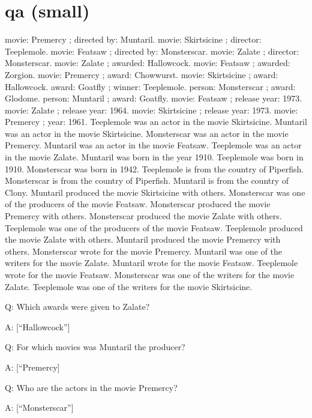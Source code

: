 \documentclass[
]{article}
\begin{document}
\section{qa (small)}\label{qa-small}

movie: Premercy ; directed by: Muntaril. movie: Skirtsicine ; director:
Teeplemole. movie: Featsaw ; directed by: Monsterscar. movie: Zalate ;
director: Monsterscar. movie: Zalate ; awarded: Hallowcock. movie:
Featsaw ; awarded: Zorgion. movie: Premercy ; award: Chowwurst. movie:
Skirtsicine ; award: Hallowcock. award: Goatfly ; winner: Teeplemole.
person: Monsterscar ; award: Glodome. person: Muntaril ; award: Goatfly.
movie: Featsaw ; release year: 1973. movie: Zalate ; release year: 1964.
movie: Skirtsicine ; release year: 1973. movie: Premercy ; year: 1961.
Teeplemole was an actor in the movie Skirtsicine. Muntaril was an actor
in the movie Skirtsicine. Monsterscar was an actor in the movie
Premercy. Muntaril was an actor in the movie Featsaw. Teeplemole was an
actor in the movie Zalate. Muntaril was born in the year 1910.
Teeplemole was born in 1910. Monsterscar was born in 1942. Teeplemole is
from the country of Piperfish. Monsterscar is from the country of
Piperfish. Muntaril is from the country of Clony. Muntaril produced the
movie Skirtsicine with others. Monsterscar was one of the producers of
the movie Featsaw. Monsterscar produced the movie Premercy with others.
Monsterscar produced the movie Zalate with others. Teeplemole was one of
the producers of the movie Featsaw. Teeplemole produced the movie Zalate
with others. Muntaril produced the movie Premercy with others.
Monsterscar wrote for the movie Premercy. Muntaril was one of the
writers for the movie Zalate. Muntaril wrote for the movie Featsaw.
Teeplemole wrote for the movie Featsaw. Monsterscar was one of the
writers for the movie Zalate. Teeplemole was one of the writers for the
movie Skirtsicine.

Q: Which awards were given to Zalate?

A: {[}``Hallowcock''{]}

Q: For which movies was Muntaril the producer?

A: {[}``Premercy{]}

Q: Who are the actors in the movie Premercy?

A: {[}``Monsterscar''{]}
\end{document}

